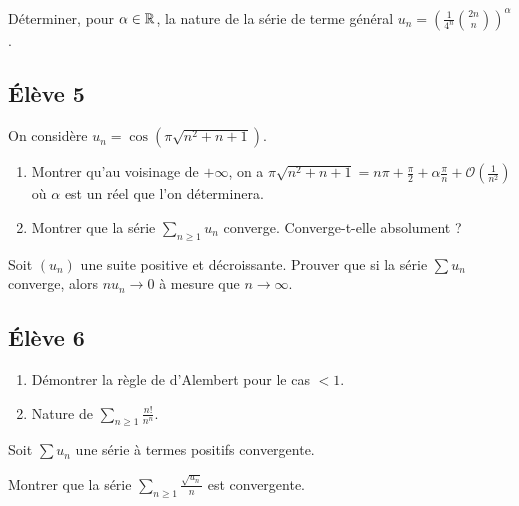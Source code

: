 \documentclass[10pt]{scrartcl}
\begin{document}
    \begin{exo}
        Déterminer, pour $\alpha\in\operatorname{\mathbb R}$, la nature de la série de terme général $u_n=\left(\frac1{4^n}\binom{2n}n\right)^\alpha$.
    \end{exo}

    \subsection*{Élève 5}
    \begin{ccp}
        On considère $u_n=\cos(\pi\sqrt{n^2+n+1})$.
        \begin{enumerate}
            \item Montrer qu'au voisinage de $+\infty$, on a $\pi\sqrt{n^2+n+1}=n\pi+\frac\pi2+\alpha\frac\pi n+\mathcal O(\frac1{n^2})$ où $\alpha$ est un réel que l'on déterminera.
            \item Montrer que la série $\sum_{n\geq 1}u_n$ converge. Converge-t-elle absolument ?
        \end{enumerate}
    \end{ccp}

    \begin{exo}
        Soit $(u_n)$ une suite positive et décroissante. Prouver que si la série $\sum u_n$ converge, alors $nu_n\to 0$ à mesure que $n\to\infty$.
    \end{exo}

    \subsection*{Élève 6}
    \begin{ccp}\hfill
        \begin{enumerate}
            \item Démontrer la règle de d'Alembert pour le cas $<1$.
            \item Nature de $\sum_{n\geq 1}\frac{n!}{n^n}$.
        \end{enumerate}
    \end{ccp}

    \begin{exo}
        Soit $\sum u_n$ une série à termes positifs convergente. 

        Montrer que la série $\sum_{n\geq 1}\frac{\sqrt{u_n}}n$ est convergente.
    \end{exo}
\end{document}
